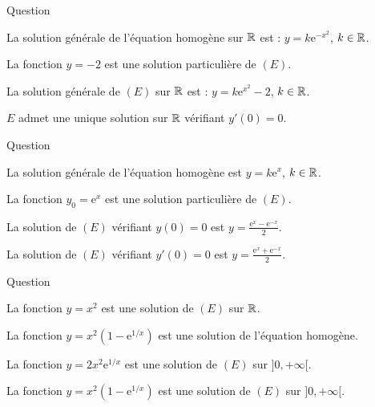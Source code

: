 \begin{multi}[multiple,feedback=
{La solution générale de l'équation homogène est : \(Y=k\mathrm{e}^{x^2}\), \(k\in \Rr\), et \(y_0=-2\) est une solution particulière. Donc la solution générale de \((E)\) sur \(\Rr\) est : \(y=k\mathrm{e}^{x^2}-2\), \(k\in \Rr\). Toute solution de \((E)\) vérifie \(y'(0)=0\).
}]{Question}
    \item La solution générale de l'équation homogène sur \(\Rr\) est : \(y=k\mathrm{e}^{-x^2}\), \(k\in \Rr\).
    \item* La fonction \(y=-2\) est une solution particulière de \((E)\).
    \item* La solution générale de \((E)\) sur \(\Rr\) est : \(y=k\mathrm{e}^{x^2}-2\), \(k\in \Rr\).
    \item \(E\) admet une unique solution sur \(\Rr\) vérifiant \(y'(0)=0\).
\end{multi}


\begin{multi}[multiple,feedback=
{La solution générale de l'équation homogène est \(y=k\mathrm{e}^{x}\), \(k\in \Rr\). On cherche une solution particulière sous la forme \(\displaystyle y_0=a\mathrm{e}^{x}\). La solution générale de \((E)\) est \(\displaystyle y=k\mathrm{e}^{-x}+\frac{\mathrm{e}^{x}}{2}\), \(k\in \Rr\). La condition \(y(0)=0\) donne \(k=-1/2\), et la condition \(y'(0)=0\) donne \(k=1/2\).
}]{Question}
    \item La solution générale de l'équation homogène est \(y=k\mathrm{e}^{x}\), \(k\in \Rr\).
    \item La fonction \(\displaystyle y_0=\mathrm{e}^{x}\) est une solution particulière de \((E)\).
    \item* La solution de \((E)\) vérifiant \(y(0)=0\) est \(\displaystyle y=\frac{\mathrm{e}^{x}-\mathrm{e}^{-x}}{2}\).
    \item* La solution de \((E)\) vérifiant \(y'(0)=0\) est \(\displaystyle y=\frac{\mathrm{e}^{x}+\mathrm{e}^{-x}}{2}\).
\end{multi}


\begin{multi}{Question}
    \item* La fonction \(\displaystyle y=x^2\) est une solution de \((E)\) sur \(\Rr\).
    \item La fonction \(\displaystyle y=x^2\left(1-\mathrm{e}^{1/x}\right)\) est une solution de l'équation homogène.
    \item La fonction \(\displaystyle y=2x^2\mathrm{e}^{1/x}\) est une solution de \((E)\) sur \(]0,+\infty[\).
    \item* La fonction \(\displaystyle y=x^2\left(1-\mathrm{e}^{1/x}\right)\) est une solution de \((E)\) sur \(]0,+\infty[\).
\end{multi}


